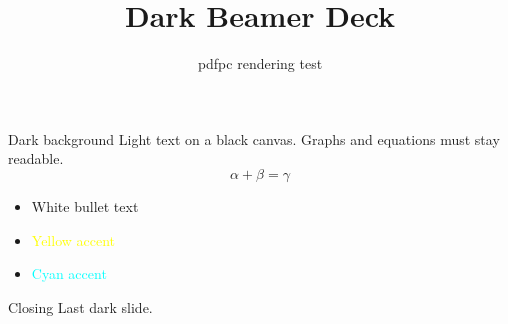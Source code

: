 \documentclass[aspectratio=169]{beamer}
\title{Dark Beamer Deck}
\author{pdfpc rendering test}
\begin{document}
\begin{frame}
  \titlepage
\end{frame}

\begin{frame}{Dark background}
  Light text on a black canvas. Graphs and equations must stay readable.
  \[
    \alpha + \beta = \gamma
  \]
  \begin{itemize}
    \item White bullet text
    \item \textcolor{yellow}{Yellow accent}
    \item \textcolor{cyan}{Cyan accent}
  \end{itemize}
\end{frame}

\begin{frame}{Closing}
  Last dark slide.
\end{frame}
\end{document}
